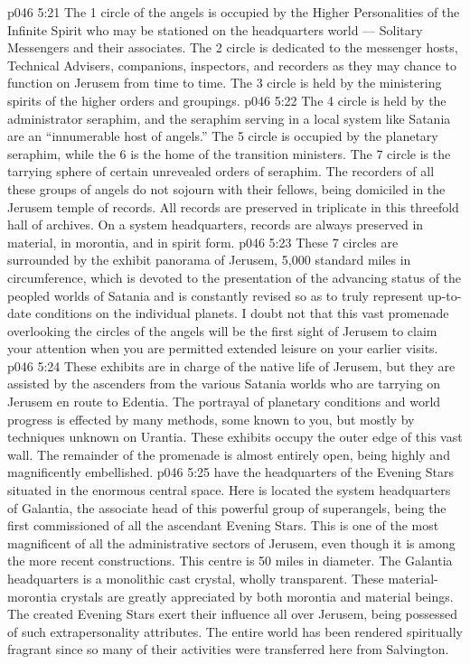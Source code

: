 \vs p046 5:21 \pc The 1 circle of the angels is occupied by the Higher Personalities of the Infinite Spirit who may be stationed on the headquarters world --- Solitary Messengers and their associates. The 2 circle is dedicated to the messenger hosts, Technical Advisers, companions, inspectors, and recorders as they may chance to function on Jerusem from time to time. The 3 circle is held by the ministering spirits of the higher orders and groupings.
\vs p046 5:22 The 4 circle is held by the administrator seraphim, and the seraphim serving in a local system like Satania are an “innumerable host of angels.” The 5 circle is occupied by the planetary seraphim, while the 6 is the home of the transition ministers. The 7 circle is the tarrying sphere of certain unrevealed orders of seraphim. The recorders of all these groups of angels do not sojourn with their fellows, being domiciled in the Jerusem temple of records. All records are preserved in triplicate in this threefold hall of archives. On a system headquarters, records are always preserved in material, in morontia, and in spirit form.
\vs p046 5:23 These 7 circles are surrounded by the exhibit panorama of Jerusem, 5,000 standard miles in circumference, which is devoted to the presentation of the advancing status of the peopled worlds of Satania and is constantly revised so as to truly represent up\hyp{}to\hyp{}date conditions on the individual planets. I doubt not that this vast promenade overlooking the circles of the angels will be the first sight of Jerusem to claim your attention when you are permitted extended leisure on your earlier visits.
\vs p046 5:24 These exhibits are in charge of the native life of Jerusem, but they are assisted by the ascenders from the various Satania worlds who are tarrying on Jerusem en route to Edentia. The portrayal of planetary conditions and world progress is effected by many methods, some known to you, but mostly by techniques unknown on Urantia. These exhibits occupy the outer edge of this vast wall. The remainder of the promenade is almost entirely open, being highly and magnificently embellished.
\vs p046 5:25 \bibnobreakspace {} have the headquarters of the Evening Stars situated in the enormous central space. Here is located the system headquarters of Galantia, the associate head of this powerful group of superangels, being the first commissioned of all the ascendant Evening Stars. This is one of the most magnificent of all the administrative sectors of Jerusem, even though it is among the more recent constructions. This centre is 50 miles in diameter. The Galantia headquarters is a monolithic cast crystal, wholly transparent. These material\hyp{}morontia crystals are greatly appreciated by both morontia and material beings. The created Evening Stars exert their influence all over Jerusem, being possessed of such extrapersonality attributes. The entire world has been rendered spiritually fragrant since so many of their activities were transferred here from Salvington.
